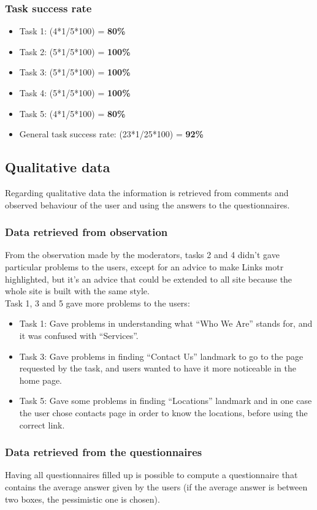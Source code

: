 \subsubsection{Task success rate}
\begin{itemize}
\item Task 1: (4*1/5*100) = \textbf{80\%}
\item Task 2: (5*1/5*100) = \textbf{100\%}
\item Task 3: (5*1/5*100) = \textbf{100\%}
\item Task 4: (5*1/5*100) = \textbf{100\%}
\item Task 5: (4*1/5*100) = \textbf{80\%}
\item General task success rate: (23*1/25*100) = \textbf{92\%}
\end{itemize}

\subsection{Qualitative data}
Regarding qualitative data the information is retrieved from comments and observed behaviour of the user and using the answers to the questionnaires.

\subsubsection{Data retrieved from observation}
From the observation made by the moderators, tasks 2 and 4 didn't gave particular problems to the users, except for an advice to make Links motr highlighted, but it's an advice that could be extended to all site because the whole site is built with the same style.\\
Task 1, 3 and 5 gave more problems to the users:
\begin{itemize}
\item Task 1: Gave problems in understanding what ``Who We Are'' stands for, and it was confused with ``Services''.
\item Task 3: Gave problems in finding ``Contact Us'' landmark to go to the page requested by the task, and users wanted to have it more noticeable in the home page.
\item Task 5: Gave some problems in finding ``Locations'' landmark and in one case the user chose contacts page in order to know the locations, before using the correct link.
\end{itemize}

\subsubsection{Data retrieved from the questionnaires}
Having all questionnaires filled up is possible to compute a questionnaire that contains the average answer given by the users (if the average answer is between two boxes, the pessimistic one is chosen).

